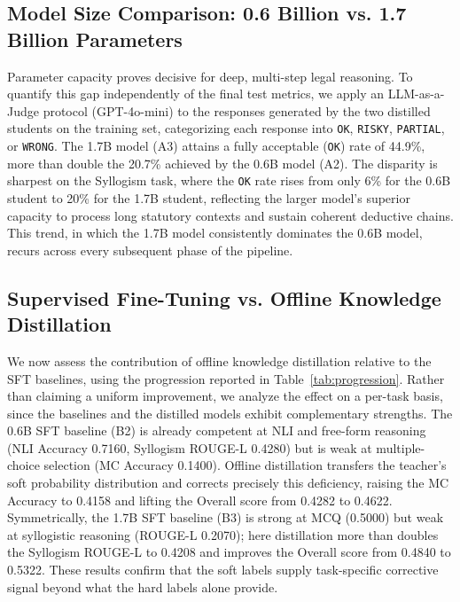 \subsection{Model Size Comparison: 0.6 Billion vs. 1.7 Billion Parameters}

Parameter capacity proves decisive for deep, multi-step legal reasoning. To quantify this gap independently of the final test metrics, we apply an LLM-as-a-Judge protocol (GPT-4o-mini) to the responses generated by the two distilled students on the training set, categorizing each response into \texttt{OK}, \texttt{RISKY}, \texttt{PARTIAL}, or \texttt{WRONG}. The 1.7B model (A3) attains a fully acceptable (\texttt{OK}) rate of 44.9\%, more than double the 20.7\% achieved by the 0.6B model (A2). The disparity is sharpest on the Syllogism task, where the \texttt{OK} rate rises from only 6\% for the 0.6B student to 20\% for the 1.7B student, reflecting the larger model's superior capacity to process long statutory contexts and sustain coherent deductive chains. This trend, in which the 1.7B model consistently dominates the 0.6B model, recurs across every subsequent phase of the pipeline.

\subsection{Supervised Fine-Tuning vs. Offline Knowledge Distillation}

We now assess the contribution of offline knowledge distillation \parencite{hinton2015distillingknowledgeneuralnetwork} relative to the SFT baselines, using the progression reported in Table~\ref{tab:progression}. Rather than claiming a uniform improvement, we analyze the effect on a per-task basis, since the baselines and the distilled models exhibit complementary strengths. The 0.6B SFT baseline (B2) is already competent at NLI and free-form reasoning (NLI Accuracy 0.7160, Syllogism ROUGE-L 0.4280) but is weak at multiple-choice selection (MC Accuracy 0.1400). Offline distillation transfers the teacher's soft probability distribution and corrects precisely this deficiency, raising the MC Accuracy to 0.4158 and lifting the Overall score from 0.4282 to 0.4622. Symmetrically, the 1.7B SFT baseline (B3) is strong at MCQ (0.5000) but weak at syllogistic reasoning (ROUGE-L 0.2070); here distillation more than doubles the Syllogism ROUGE-L to 0.4208 and improves the Overall score from 0.4840 to 0.5322. These results confirm that the soft labels supply task-specific corrective signal beyond what the hard labels alone provide.

